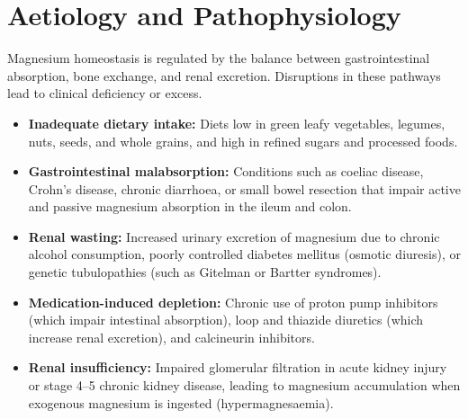 \section*{Aetiology and Pathophysiology}
Magnesium homeostasis is regulated by the balance between gastrointestinal absorption, bone exchange, and renal excretion. Disruptions in these pathways lead to clinical deficiency or excess.
\begin{itemize}
    \item \textbf{Inadequate dietary intake:} Diets low in green leafy vegetables, legumes, nuts, seeds, and whole grains, and high in refined sugars and processed foods.
    \item \textbf{Gastrointestinal malabsorption:} Conditions such as coeliac disease, Crohn's disease, chronic diarrhoea, or small bowel resection that impair active and passive magnesium absorption in the ileum and colon.
    \item \textbf{Renal wasting:} Increased urinary excretion of magnesium due to chronic alcohol consumption, poorly controlled diabetes mellitus (osmotic diuresis), or genetic tubulopathies (such as Gitelman or Bartter syndromes).
    \item \textbf{Medication-induced depletion:} Chronic use of proton pump inhibitors (which impair intestinal absorption), loop and thiazide diuretics (which increase renal excretion), and calcineurin inhibitors.
    \item \textbf{Renal insufficiency:} Impaired glomerular filtration in acute kidney injury or stage 4--5 chronic kidney disease, leading to magnesium accumulation when exogenous magnesium is ingested (hypermagnesaemia).
\end{itemize}

